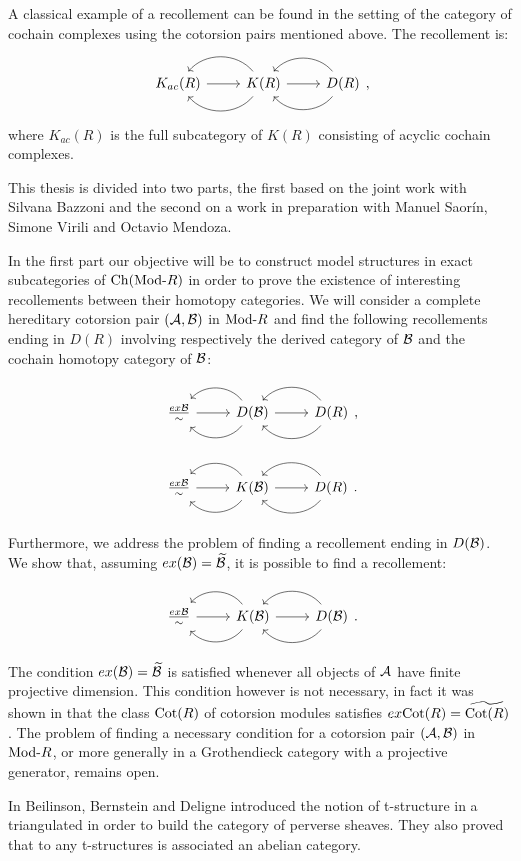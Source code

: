 A classical example of a recollement can be found in the setting of the category of cochain complexes using the cotorsion pairs mentioned above. The recollement is:
\begin{equation*}
\recdiagram{K_{ac}(R)}{K(R)}{D(R)},
\end{equation*}
where $K_{ac}(R)$ is the full subcategory of $K(R)$ consisting of acyclic cochain complexes.

This thesis is divided into two parts, the first based on the joint work \cite{bazzoni2018recollements} with Silvana Bazzoni and the second on a work in preparation with Manuel Saor\'in, Simone Virili and Octavio Mendoza.

\smallskip

In the first part our objective will be to construct model structures in exact subcategories of $\mathrm{Ch}(\mathrm{Mod}\textrm{-}R)$ in order to prove the existence of interesting recollements between their homotopy categories. We will consider a complete hereditary cotorsion pair $(\mathcal{A},\mathcal{B})$ in $\mathrm{Mod}\textrm{-}R$ and find the following recollements ending in $D(R)$ involving respectively the derived category of $\mathcal{B}$ and the cochain homotopy category of $\mathcal{B}$:

\begin{equation*}
  \recdiagram{\frac{ex \B}{\sim}}{D(\B)}{D(R)},
\end{equation*}

\begin{equation*}
  \recdiagram{\frac{ex \B}{\sim}}{K(\B)}{D(R)}.
\end{equation*}

Furthermore, we address the problem of finding a recollement ending in $D(\mathcal{B})$. We show that, assuming $ex(\mathcal{B})=\widetilde{\mathcal{B}}$, it is possible to find a recollement:

\begin{equation*}
  \recdiagram{\frac{ex \B}{\sim}}{K(\B)}{D(\B)}.
\end{equation*}

The condition $ex(\mathcal{B})=\widetilde{\mathcal{B}}$ is satisfied whenever all objects of $\mathcal{A}$ have finite projective dimension. This condition however is not necessary, in fact it was shown in \cite{BCIE} that the class $\mathrm{Cot}(R)$ of cotorsion modules satisfies $ex\mathrm{Cot}(R)=\widetilde{\mathrm{Cot}(R)}$. The problem of finding a necessary condition for a cotorsion pair $(\mathcal{A},\mathcal{B})$ in $\mathrm{Mod}\textrm{-}R$, or more generally in a Grothendieck category with a projective generator, remains open.

\smallskip

In \cite{bbd82} Beilinson, Bernstein and Deligne introduced the notion of t-structure in a triangulated in order to build the category of perverse sheaves. They also proved that to any t-structures is associated an abelian category.

